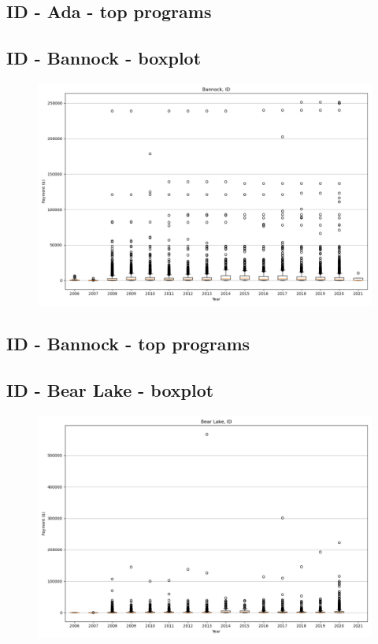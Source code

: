 \subsection*{ID - Ada - top programs}

\newpage
\subsection*{ID - Bannock - boxplot}
\begin{figure}[h]
\centering
\includegraphics[width=7in]{../output/boxplots/counties/Bannock-ID_boxplot.png}
\end{figure}


\subsection*{ID - Bannock - top programs}

\newpage
\subsection*{ID - Bear Lake - boxplot}
\begin{figure}[h]
\centering
\includegraphics[width=7in]{../output/boxplots/counties/Bear Lake-ID_boxplot.png}
\end{figure}


